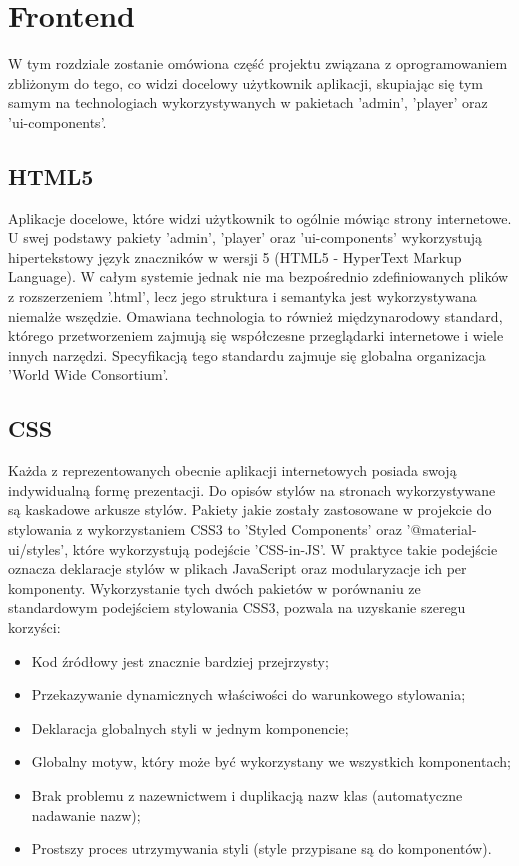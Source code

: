 \chapter{Frontend}
\label{ch:frontend}
W tym rozdziale zostanie omówiona część projektu związana z oprogramowaniem zbliżonym do tego, co widzi docelowy użytkownik aplikacji, skupiając się tym samym na technologiach wykorzystywanych w pakietach 'admin', 'player' oraz 'ui-components'.

\section{HTML5}
Aplikacje docelowe, które widzi użytkownik to ogólnie mówiąc strony internetowe. U swej podstawy pakiety 'admin', 'player' oraz 'ui-components' wykorzystują hipertekstowy język znaczników w wersji 5 (HTML5 - HyperText Markup Language). W całym systemie jednak nie ma bezpośrednio zdefiniowanych plików z rozszerzeniem '.html', lecz jego struktura i semantyka jest wykorzystywana niemalże wszędzie. Omawiana technologia to również międzynarodowy standard, którego przetworzeniem zajmują się współczesne przeglądarki internetowe i wiele innych narzędzi. Specyfikacją tego standardu zajmuje się globalna organizacja 'World Wide Consortium'. \cite{HTMLDocs}

\section{CSS}
Każda z reprezentowanych obecnie aplikacji internetowych posiada swoją indywidualną formę prezentacji. Do opisów stylów na stronach wykorzystywane są kaskadowe arkusze stylów. Pakiety jakie zostały zastosowane w projekcie do stylowania z wykorzystaniem CSS3 to 'Styled Components' oraz '@material-ui/styles', które wykorzystują podejście 'CSS-in-JS'. W praktyce takie podejście oznacza deklaracje stylów w plikach JavaScript oraz modularyzacje ich per komponenty. Wykorzystanie tych dwóch pakietów w porównaniu ze standardowym podejściem stylowania CSS3, pozwala na uzyskanie szeregu korzyści:

\begin{itemize}
    \item Kod źródłowy jest znacznie bardziej przejrzysty;
    \item Przekazywanie dynamicznych właściwości do warunkowego stylowania;
    \item Deklaracja globalnych styli w jednym komponencie;
    \item Globalny motyw, który może być wykorzystany we wszystkich komponentach;
    \item Brak problemu z nazewnictwem i duplikacją nazw klas (automatyczne nadawanie nazw);
    \item Prostszy proces utrzymywania styli (style przypisane są do komponentów).
\end{itemize}

